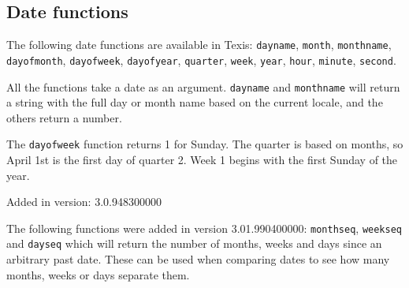 \subsection{Date functions}

The following date functions are available in Texis:
\verb`dayname`, \verb`month`, \verb`monthname`, \verb`dayofmonth`,
\verb`dayofweek`, \verb`dayofyear`, \verb`quarter`, \verb`week`,
\verb`year`, \verb`hour`, \verb`minute`, \verb`second`.

All the functions take a date as an argument.  \verb`dayname` and \verb`monthname` will return a string with the full day or month name based on the current
locale, and the others return a number.

The \verb`dayofweek` function returns 1 for Sunday.  The quarter is
based on months, so April 1st is the first day of quarter 2.  Week 1
begins with the first Sunday of the year.

Added in version: 3.0.948300000

The following functions were added in version 3.01.990400000:
\verb`monthseq`, \verb`weekseq` and \verb`dayseq` which will return the
number of months, weeks and days since an arbitrary past date.  These
can be used when comparing dates to see how many months, weeks or days
separate them.

